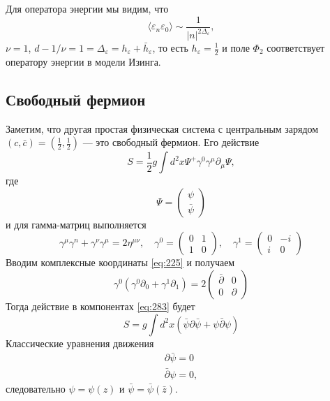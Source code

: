 \documentclass[a4paper,12pt]{article}
\theoremstyle{definition}
\theoremstyle{definition}
\theoremstyle{definition}
\begin{document}
Для оператора энергии мы видим, что
\begin{equation}
  \label{eq:281}
  \langle\varepsilon_{n}\varepsilon_{0}\rangle\sim \frac{1}{|n|^{2\Delta_{\varepsilon}}},
\end{equation}
$\nu=1$, $d-1/\nu=1=\Delta_{\varepsilon}=h_{\varepsilon}+\bar h_{\varepsilon}$, то есть $h_{\varepsilon}=\frac{1}{2}$ и поле $\Phi_{2}$ соответствует оператору энергии в модели Изинга.

\subsection{Свободный фермион}
\label{sec:free-fermion}

Заметим, что другая простая физическая система с центральным зарядом $(c,\bar c)=\left(\frac{1}{2},\frac{1}{2}\right)$ --- это свободный фермион. Его действие
\begin{equation}
  \label{eq:282}
  S=\frac{1}{2} g \int d^{2}x\Psi^{+}\gamma^{0}\gamma^{\mu}\partial_{\mu}\Psi,
\end{equation}
где
\begin{equation}
  \label{eq:283}
  \Psi=
  \begin{pmatrix}
    \psi\\ \bar \psi
  \end{pmatrix}
\end{equation}
и для гамма-матриц выполняется
\begin{equation}
  \label{eq:284}
  \gamma^{\mu}\gamma^{n}+\gamma^{\nu}\gamma^{\mu}=2\eta^{\mu\nu},\quad \gamma^{0}=
  \begin{pmatrix}
    0 & 1\\
    1 & 0
  \end{pmatrix}, \quad
  \gamma^{1}=
  \begin{pmatrix}
    0 & -i\\
    i & 0
  \end{pmatrix}
\end{equation}
Вводим комплексные координаты \eqref{eq:225} и получаем
\begin{equation}
  \label{eq:285}
  \gamma^{0}(\gamma^{0}\partial_{0}+\gamma^{1}\partial_{1})=2
  \begin{pmatrix}
    \bar \partial & 0\\
    0 & \partial
  \end{pmatrix}
\end{equation}
Тогда действие в компонентах \eqref{eq:283} будет
\begin{equation}
  \label{eq:286}
  S=g\int d^{2}x (\bar \psi \partial \bar \psi + \psi\bar \partial \psi)
\end{equation}
Классические уравнения движения
\begin{eqnarray}
  \label{eq:287}
  \partial \bar \psi=0\\
  \bar \partial \psi=0, 
\end{eqnarray}
следовательно $\psi=\psi(z)$ и $\bar \psi=\bar \psi(\bar z)$. 
\end{document}
